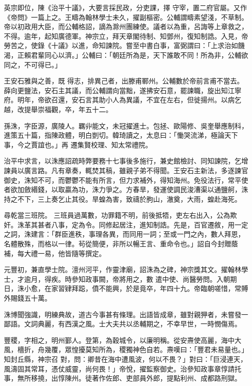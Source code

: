 \begin{pinyinscope}
 英宗即位，陳《治平十議》，大要言採民政，分吏課，擇
 守宰，置二府官屬。又作《帝問》一篇上之。王疇為翰林學士未久，擢副樞密。公輔謂疇素望淺，不草制。帝以初政用大臣，而公輔格詔，謫為滁州團練使。議者以為重，呂誨等上章救之，不得。逾年，起知廣德軍。神宗立，拜天章閣待制、知鄧州，復知制誥。入見，帝勞苦之，使錄《十議》以進，命知諫院。嘗至中書白事，富弼謂曰：「上求治如饑渴，正賴君輩同心以濟。」公輔曰：「朝廷所為是，天下誰敢不同！所為非，公輔欲同之，不可得已。」



 王安石雅與之善，既
 得志，排異己者，出滕甫鄆州。公輔數於帝前言甫不當去。薛向更鹽法，安石主其議，而公輔謂向當黜，遂拂安石意，罷諫職，旋出知江寧府。明年，帝欲召還，安石言其助小人為異議，不宜在左右，但徙揚州。以病乞越，改提舉崇福觀，卒，年五十二。



 孫洙，字臣源，廣陵人。羈丱能文，未冠擢進士。包拯、歐陽修、吳奎舉應制科，進策五十篇，指陳政體，明白剴切。韓琦讀之，太息曰：「慟哭流涕，極論天下事，今之賈誼也。」再
 遷集賢校理、知太常禮院。



 治平中求言，以洙應詔疏時弊要務十七事後多施行，兼史館檢討、同知諫院，乞增諫員以廣言路。凡有章奏，輒焚其稿，雖親子弟不得聞。王安石主新法，多逐諫官御史，洙知不可，而鬱鬱不能有所言，但力求補外，得知海州。免役法行，常平使者欲加斂緡錢，以取贏為功，洙力爭之。方春旱，發運使調民浚漕渠以通鹽舸，洙持之不下，三上奏乞止其役。旱蝗為害，致禱於朐山，澈奠，大雨，蝗赴海死。



 尋乾當三班院。
 三班員過萬數，功罪籍不明，前後抵牾，吏左右出入，公為欺奸。洙革其甚者八事，定為令。同修起居注，進知制誥。先是，百官遷敘，用一定之詞，洙建言：「群臣進秩，事理各異，而同用一詞；至或一門之內，數人拜恩，名體散殊，而格以一律。茍從簡便，非所以暢王言、重命令也。」詔自今封贈蔭補，每大禮一易，他皆隨等撰定。



 元豐初，兼直學士院。澶州河平，作靈津廟，詔洙為之碑，神宗獎其文。擢翰林學士，才逾月，得疾。時參知政事闕，帝將用之，數
 遣中使、尚醫勞問。入朝期日，洙小愈，在家習肄拜跽，僨不能興，於是竟卒，年四十九。帝臨朝嗟惜，常賻外賜錢五十萬。



 洙博聞強識，明練典故，道古今事甚有條理。出語皆成章，雖對親狎者，未嘗發一鄙語。文詞典麗，有西漢之風。士大夫共以丞輔期之，不幸早世，一時憫傷焉。



 豐稷，字相之，明州鄞人。登第，為穀城令，以廉明稱。從安燾使高麗，海中大風，檣折，舟幾覆，眾惶擾莫知所為，稷獨神色自若。燾嘆曰：「豐君未易量也。」知封丘縣，神宗召
 對，問：卿昔在海中遭風波，何以不畏？」對曰：「巨浸連天，風濤固其常耳，憑仗威靈，尚何畏！」帝悅，擢監察御史。治參知政事章惇請托事，無所移撓，出惇陳州。徒著作佐郎、吏部員外郎，提點利州、成都路刑獄。




\end{pinyinscope}
